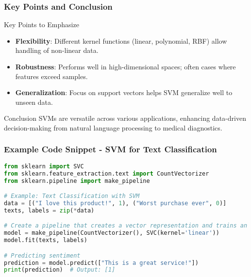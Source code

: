 \documentclass{beamer}
\begin{document}
\begin{frame}[fragile]
    \frametitle{Key Points and Conclusion}
    \begin{block}{Key Points to Emphasize}
        \begin{itemize}
            \item \textbf{Flexibility}: Different kernel functions (linear, polynomial, RBF) allow handling of non-linear data.
            \item \textbf{Robustness}: Performs well in high-dimensional spaces; often cases where features exceed samples.
            \item \textbf{Generalization}: Focus on support vectors helps SVM generalize well to unseen data.
        \end{itemize}
    \end{block}

    \begin{block}{Conclusion}
        SVMs are versatile across various applications, enhancing data-driven decision-making from natural language processing to medical diagnostics.
    \end{block}
\end{frame}

\begin{frame}[fragile]
    \frametitle{Example Code Snippet - SVM for Text Classification}
    \begin{lstlisting}[language=Python]
from sklearn import SVC
from sklearn.feature_extraction.text import CountVectorizer
from sklearn.pipeline import make_pipeline

# Example: Text Classification with SVM
data = [("I love this product!", 1), ("Worst purchase ever", 0)]
texts, labels = zip(*data)

# Create a pipeline that creates a vector representation and trains an SVM model
model = make_pipeline(CountVectorizer(), SVC(kernel='linear'))
model.fit(texts, labels)

# Predicting sentiment
prediction = model.predict(["This is a great service!"])
print(prediction)  # Output: [1]
    \end{lstlisting}
\end{frame}
\end{document}
